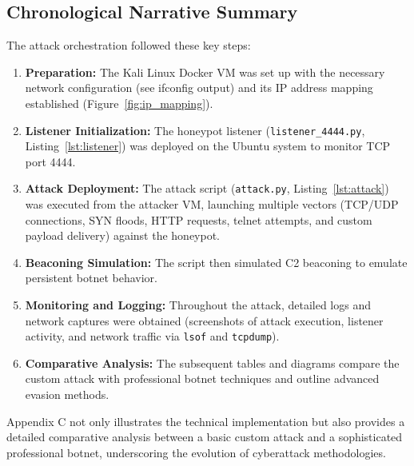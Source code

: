 \documentclass{article}
\begin{document}
\subsection*{Chronological Narrative Summary}
The attack orchestration followed these key steps:
\begin{enumerate}
    \item \textbf{Preparation:} The Kali Linux Docker VM was set up with the necessary network configuration (see ifconfig output) and its IP address mapping established (Figure~\ref{fig:ip_mapping}).
    \item \textbf{Listener Initialization:} The honeypot listener (\texttt{listener\_4444.py}, Listing~\ref{lst:listener}) was deployed on the Ubuntu system to monitor TCP port 4444.
    \item \textbf{Attack Deployment:} The attack script (\texttt{attack.py}, Listing~\ref{lst:attack}) was executed from the attacker VM, launching multiple vectors (TCP/UDP connections, SYN floods, HTTP requests, telnet attempts, and custom payload delivery) against the honeypot.
    \item \textbf{Beaconing Simulation:} The script then simulated C2 beaconing to emulate persistent botnet behavior.
    \item \textbf{Monitoring and Logging:} Throughout the attack, detailed logs and network captures were obtained (screenshots of attack execution, listener activity, and network traffic via \texttt{lsof} and \texttt{tcpdump}).
    \item \textbf{Comparative Analysis:} The subsequent tables and diagrams compare the custom attack with professional botnet techniques and outline advanced evasion methods.
\end{enumerate}

Appendix C not only illustrates the technical implementation but also provides a detailed comparative analysis between a basic custom attack and a sophisticated professional botnet, underscoring the evolution of cyberattack methodologies.


\clearpage
\nocite{*}
\printbibliography[heading=bibintoc,title={References}]
\end{document}
